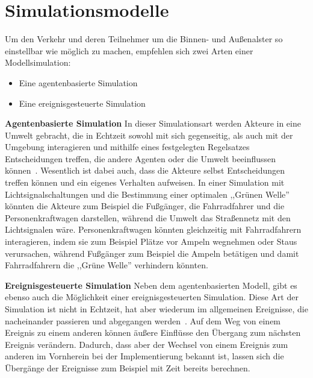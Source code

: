 %
%
\section{Simulationsmodelle}\label{sec:simulationsmodelle}

Um den Verkehr und deren Teilnehmer um die Binnen- und Außenalster so einstellbar wie möglich zu machen, empfehlen sich zwei Arten einer Modellsimulation:

\begin{itemize}

    \item Eine agentenbasierte Simulation
    \item Eine ereignisgesteuerte Simulation

\end{itemize}

\textbf{Agentenbasierte Simulation}
In dieser Simulationsart werden Akteure in eine Umwelt gebracht, die in Echtzeit sowohl mit sich gegenseitig, als auch mit der Umgebung interagieren und mithilfe eines festgelegten Regelsatzes Entscheidungen treffen, die andere Agenten oder die Umwelt beeinflussen können~\cite{Baldwin2015}.
Wesentlich ist dabei auch, dass die Akteure selbst Entscheidungen treffen können und ein eigenes Verhalten aufweisen.
In einer Simulation mit Lichtsignalschaltungen und die Bestimmung einer optimalen ,,Grünen Welle'' könnten die Akteure zum Beispiel die Fußgänger, die Fahrradfahrer und die Personenkraftwagen darstellen, während die Umwelt das Straßennetz mit den Lichtsignalen wäre.
Personenkraftwagen könnten gleichzeitig mit Fahrradfahrern interagieren, indem sie zum Beispiel Plätze vor Ampeln wegnehmen oder Staus verursachen, während Fußgänger zum Beispiel die Ampeln betätigen und damit Fahrradfahrern die ,,Grüne Welle'' verhindern könnten.

\textbf{Ereignisgesteuerte Simulation}
Neben dem agentenbasierten Modell, gibt es ebenso auch die Möglichkeit einer ereignisgesteuerten Simulation.
Diese Art der Simulation ist nicht in Echtzeit, hat aber wiederum im allgemeinen Ereignisse, die nacheinander passieren und abgegangen werden~\cite{Baldwin2015}.
Auf dem Weg von einem Ereignis zu einem anderen können äußere Einflüsse den Übergang zum nächsten Ereignis verändern.
Dadurch, dass aber der Wechsel von einem Ereignis zum anderen im Vornherein bei der Implementierung bekannt ist, lassen sich die Übergänge der Ereignisse zum Beispiel mit Zeit bereits berechnen.

